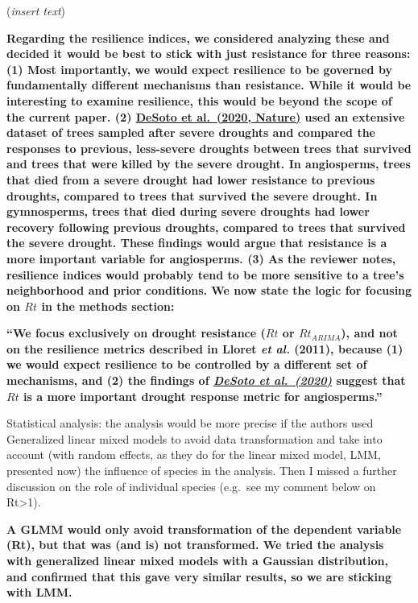 \documentclass[
]{article}
\begin{document}
(\emph{insert text})

\textbf{Regarding the resilience indices, we considered analyzing these
and decided it would be best to stick with just resistance for three
reasons: (1) Most importantly, we would expect resilience to be governed
by fundamentally different mechanisms than resistance. While it would be
interesting to examine resilience, this would be beyond the scope of the
current paper. (2)
\href{https://www.nature.com/articles/s41467-020-14300-5}{DeSoto et
al.~(2020, Nature)} used an extensive dataset of trees sampled after
severe droughts and compared the responses to previous, less-severe
droughts between trees that survived and trees that were killed by the
severe drought. In angiosperms, trees that died from a severe drought
had lower resistance to previous droughts, compared to trees that
survived the severe drought. In gymnosperms, trees that died during
severe droughts had lower recovery following previous droughts, compared
to trees that survived the severe drought. These findings would argue
that resistance is a more important variable for angiosperms. (3) As the
reviewer notes, resilience indices would probably tend to be more
sensitive to a tree's neighborhood and prior conditions. We now state
the logic for focusing on \(Rt\) in the methods section:}

\textbf{``We focus exclusively on drought resistance (\(Rt\) or
\(Rt_{ARIMA}\)), and not on the resilience metrics described in Lloret
\emph{et al.} (2011), because (1) we would expect resilience to be
controlled by a different set of mechanisms, and (2) the findings of
\emph{\href{https://www.nature.com/articles/s41467-020-14300-5}{DeSoto
et al.~(2020)}} suggest that \(Rt\) is a more important drought response
metric for angiosperms.''}

Statistical analysis: the analysis would be more precise if the authors
used Generalized linear mixed models to avoid data transformation and
take into account (with random effects, as they do for the linear mixed
model, LMM, presented now) the influence of species in the analysis.
Then I missed a further discussion on the role of individual species
(e.g.~see my comment below on Rt\textgreater1).

\textbf{A GLMM would only avoid transformation of the dependent variable
(Rt), but that was (and is) not transformed. We tried the analysis with
generalized linear mixed models with a Gaussian distribution, and
confirmed that this gave very similar results, so we are sticking with
LMM.}
\end{document}
